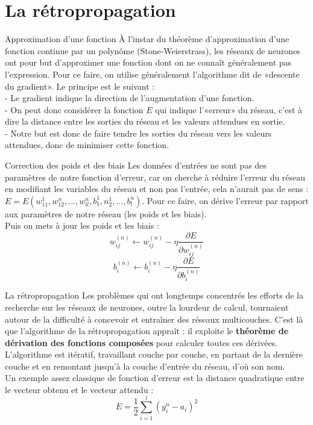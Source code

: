 \documentclass[ignorenonframetext,]{beamer}
\begin{document}
\section{La rétropropagation}
\frame{\sectionpage}
\begin{frame}{Approximation d'une fonction}
	À l'instar du théorème d'approximation d'une fonction continue par un polynôme (Stone-Weierstrass), les réseaux de neurones ont pour but d'approximer une fonction dont on ne connaît généralement pas l'expression. Pour ce faire, on utilise généralement l'algorithme dit de «descente du gradient». Le principe est le suivant : \\
    - Le gradient indique la direction de l'augmentation d'une fonction. \\
    - On peut donc considérer la fonction $E$ qui indique l'«erreur» du réseau, c'est à dire la distance entre les sorties du réseau et les valeurs attendues en sortie. \\
    - Notre but est donc de faire tendre les sorties du réseau vers les valeurs attendues, donc de minimiser cette fonction. \\
\end{frame}

\begin{frame}{Correction des poids et des biais}
    Les données d'entrées ne sont pas des paramètres de notre fonction d'erreur, car on cherche à réduire l'erreur du réseau en modifiant les variables du réseau et non pas l'entrée, cela n'aurait pas de sens : $ E = E(w_{11}^1, w_{12}^n, ..., w_{ll}^n, b_1^1, n_2^1, ..., b_l^n) $.
    Pour ce faire, on dérive l'erreur par rapport aux paramètres de notre réseau (les poids et les biais). \\
    Puis on mets à jour les poids et les biais :
    \[ w_{ij}^{(n)} \longleftarrow w_{ij}^{(n)} - \eta \frac{\partial{E}}{\partial{w_{ij}^{(n)}}} \]
    \[ b_i^{(n)} \longleftarrow b_i^{(n)} - \eta \frac{\partial{E}}{\partial{b_i^{(n)}}} \]
\end{frame}

\begin{frame}{La rétropropagation}
    Les problèmes qui ont longtemps concentrés les efforts de la recherche sur les réseaux de neurones, outre la lourdeur de calcul, tournaient autour de la difficulté à concevoir et entraîner des réseaux multicouches. C'est là que l'algorithme de la rétropropagation appraît : il exploite le \textbf{théorème de dérivation des fonctions composées} pour calculer toutes ces dérivées.\\
    L'algorithme est itératif, travaillant couche par couche, en partant de la dernière couche et en remontant jusqu'à la couche d'entrée du réseau, d'où son nom. \\
    Un exemple assez classique de fonction d'erreur est la distance quadratique entre le vecteur obtenu et le vecteur attendu :
    \[ E = \frac{1}{2} \sum_{i=1}^l (y_i^n-a_i)^2 \]
\end{frame}
\end{document}
